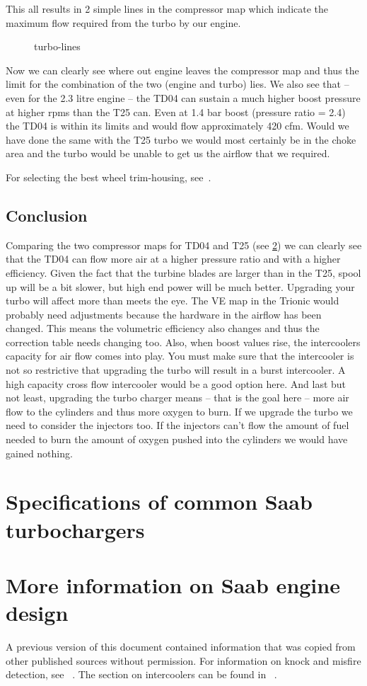 \documentclass[11pt,a4paper]{book}
\newcommand{\Mfig}[1]{%
\begin{figure}[<+htpb+>]
    \centering
    \missingfigure{#1}
    \caption{#1}
\end{figure}}
\begin{document}
This all results in 2 simple lines in the compressor map which indicate the maximum flow required
from the turbo by our engine.
\Mfig{turbo-lines}
Now we can clearly see where out engine leaves the compressor map and thus the limit for the
combination of the two (engine and turbo) lies.
We also see that – even for the 2.3 litre engine – the TD04 can sustain a much higher boost pressure
at higher rpms than the T25 can. Even at 1.4 bar boost (pressure ratio = 2.4) the TD04 is within its
limits and would flow approximately 420 cfm. Would we have done the same with the T25 turbo we
would most certainly be in the choke area and the turbo would be unable to get us the airflow that we
required.

For selecting the best wheel trim-housing, see~\cite{isaac-lowry_turbo_2004}.

\section{Conclusion}
Comparing the two compressor maps for TD04 and T25 (see \cref{chap:turbo-specs}) we can clearly see that the TD04 can flow
more air at a higher pressure ratio and with a higher efficiency. Given the fact that the turbine blades
are larger than in the T25, spool up will be a bit slower, but high end power will be much better.
Upgrading your turbo will affect more than meets the eye. The VE map in the Trionic would probably
need adjustments because the hardware in the airflow has been changed. This means the volumetric
efficiency also changes and thus the correction table needs changing too.
Also, when boost values rise, the intercoolers capacity for air flow comes into play. You must make
sure that the intercooler is not so restrictive that upgrading the turbo will result in a burst intercooler.
A high capacity cross flow intercooler would be a good option here.
And last but not least, upgrading the turbo charger means – that is the goal here – more air flow to
the cylinders and thus more oxygen to burn. If we upgrade the turbo we need to consider the
injectors too. If the injectors can’t flow the amount of fuel needed to burn the amount of oxygen
pushed into the cylinders we would have gained nothing.

\chapter{Specifications of common Saab turbochargers}\label{chap:turbo-specs}

\chapter{More information on Saab engine design}
A previous version of this document contained information that was copied
from other published sources without permission. For information on knock and
misfire detection, see
\citeauthor{eriksson_closed_1998}~\cite{eriksson_closed_1998}. The section on
intercoolers can be found in
\citeauthor{ferozepuria_turbocharger}~\cite{ferozepuria_turbocharger}.
\printindex

\printbibliography
\end{document}
